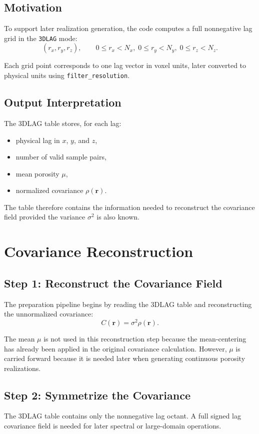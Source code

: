 \documentclass[11pt]{article}
\begin{document}
\subsection{Motivation}
To support later realization generation, the code computes a full nonnegative
lag grid in the \texttt{3DLAG} mode:
\[
(r_x, r_y, r_z),
\qquad
0 \le r_x < N_x,\;
0 \le r_y < N_y,\;
0 \le r_z < N_z.
\]

Each grid point corresponds to one lag vector in voxel units, later converted to
physical units using \texttt{filter\_resolution}.

\subsection{Output Interpretation}
The 3DLAG table stores, for each lag:
\begin{itemize}
\item physical lag in \(x\), \(y\), and \(z\),
\item number of valid sample pairs,
\item mean porosity \(\mu\),
\item normalized covariance \(\rho(\bm{r})\).
\end{itemize}

The table therefore contains the information needed to reconstruct the covariance
field provided the variance \(\sigma^2\) is also known.

\section{Covariance Reconstruction}
\subsection{Step 1: Reconstruct the Covariance Field}
The preparation pipeline begins by reading the 3DLAG table and reconstructing the
unnormalized covariance:
\[
C(\bm{r}) = \sigma^2 \rho(\bm{r}).
\]

The mean \(\mu\) is not used in this reconstruction step because the
mean-centering has already been applied in the original covariance calculation.
However, \(\mu\) is carried forward because it is needed later when generating
continuous porosity realizations.

\subsection{Step 2: Symmetrize the Covariance}
The 3DLAG table contains only the nonnegative lag octant. A full signed lag
covariance field is needed for later spectral or large-domain operations.
\end{document}
